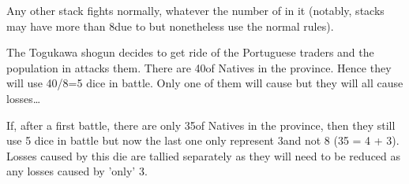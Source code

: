 Any other stack fights normally, whatever the number of \LD in it (notably,
\TUR stacks may have more than 8\LD due to \Pashas but nonetheless use the
normal rules).

\begin{exemple}
  The Togukawa shogun decides to get ride of the Portuguese traders and the
  population in  attacks them. There are 40\LD of Natives in
  the province. Hence they will use 40/8=5 dice in battle. Only one of them
  will cause \textetoile but they will all cause losses\ldots

  If, after a first battle, there are only 35\LD of Natives in the province,
  then they still use 5 dice in battle but now the last one only represent
  3\LD and not 8 (35 = 4  + 3). Losses caused by this die are
  tallied separately as they will need to be reduced as any losses caused by
  'only' 3\LD.
\end{exemple}


